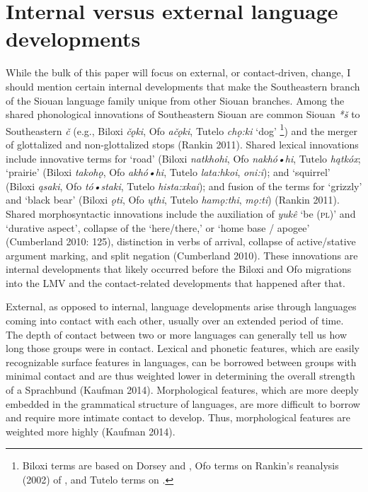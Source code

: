 \documentclass[output=paper]{LSP/langsci}
\begin{document}
\section{Internal versus external language developments}

While the bulk of this paper will focus on external, or contact-driven, change, I should mention certain internal developments that make the Southeastern branch of the Siouan language family unique from other Siouan branches. Among the shared phonological innovations of Southeastern Siouan are common Siouan \emph{*š} to Southeastern \emph{č} (e.g., Biloxi \emph{čǫki}, Ofo \emph{ačǫki}, Tutelo \emph{chǫ:ki} `dog' \footnote{Biloxi terms are based on Dorsey and \citet{Swanton1912}, Ofo terms on Rankin’s reanalysis (2002) of \citet{Swanton2012}, and Tutelo terms on \citet{Oliverio1996}.}) and the merger of glottalized and non-glottalized stops (Rankin 2011). Shared lexical innovations include innovative terms for `road' (Biloxi \emph{natkhohi}, Ofo \emph{nakhó•hi}, Tutelo \emph{hątkóx}; `prairie' (Biloxi \emph{takohǫ}, Ofo \emph{akhó•hi}, Tutelo \emph{lata:hkoi}, \emph{oni:i}); and `squirrel' (Biloxi \emph{ąsaki}, Ofo \emph{tó•staki}, Tutelo \emph{hista:xkai}); and fusion of the terms for `grizzly' and `black bear' (Biloxi \emph{ǫti}, Ofo \emph{ųthi}, Tutelo \emph{hamǫ:thi}, \emph{mǫ:ti}) (Rankin 2011). Shared morphosyntactic innovations include the auxiliation of \emph{yukê} `be (\textsc{pl})' and `durative aspect', collapse of the `here/there,' or `home base / apogee' (Cumberland 2010: 125), distinction in verbs of arrival, collapse of active/stative argument marking, and split negation (Cumberland 2010). These innovations are internal developments that likely occurred before the Biloxi and Ofo migrations into the LMV and the contact-related developments that happened after that.

External, as opposed to internal, language developments arise through languages coming into contact with each other, usually over an extended period of time. The depth of contact between two or more languages can generally tell us how long those groups were in contact. Lexical and phonetic features, which are easily recognizable surface features in languages, can be borrowed between groups with minimal contact and are thus weighted lower in determining the overall strength of a Sprachbund (Kaufman 2014). Morphological features, which are more deeply embedded in the grammatical structure of languages, are more difficult to borrow and require more intimate contact to develop. Thus, morphological features are weighted more highly (Kaufman 2014).
\end{document}
